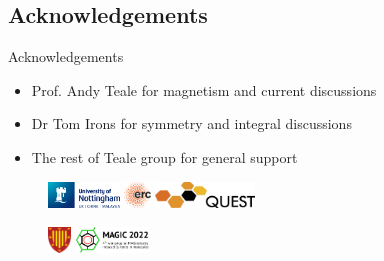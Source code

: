 \subsection{Acknowledgements}
\begin{frame}{Acknowledgements}
  \begin{itemize}
    \item Prof. Andy Teale for magnetism and current discussions
    \item Dr Tom Irons for symmetry and integral discussions
    \item The rest of Teale group for general support
  \end{itemize}

  \vspace{0.5cm}

  \begin{figure}
    \includegraphics[height=0.7cm, keepaspectratio]{images/UoNlogo.eps}
    \hspace{0.5cm}
    \includegraphics[height=0.7cm, keepaspectratio]{images/LOGO_ERC.eps}
    \hspace{0.5cm}
    \includegraphics[height=0.7cm, keepaspectratio]{images/quest.eps}

    \vspace{0.3cm}

    \includegraphics[height=0.7cm, keepaspectratio]{images/Peterhouse_shield.eps}
    \hspace{0.5cm}
    \includegraphics[height=0.7cm, keepaspectratio]{images/magic_logo/magiclogo.pdf}
  \end{figure}
\end{frame}